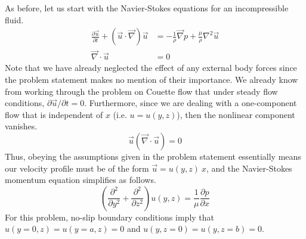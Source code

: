 As before, let us start with the Navier-Stokes equations for an incompressible fluid.
\begin{align}
    \frac{\partial \vec{u}}{\partial t} + (\vec{u}\cdot\vec{\nabla})\vec{u} &= -\frac{1}{\rho}\vec{\nabla}p + \frac{\mu}{\rho}\nabla^2\vec{u}\\
    \vec{\nabla}\cdot\vec{u} &= 0
\end{align}
Note that we have already neglected the effect of any external body forces since the problem statement makes no mention of their importance. We already know from working through the problem on Couette flow that under steady flow conditions, $\partial \vec{u}/\partial t = 0$. Furthermore, since we are dealing with a one-component flow that is independent of $x$ (i.e. $u = u(y,z)$), then the nonlinear component vanishes.
\begin{equation}
    \vec{u}(\vec{\nabla}\cdot\vec{u}) = 0
\end{equation}
Thus, obeying the assumptions given in the problem statement essentially means our velocity profile must be of the form $\vec{u} = u(y,z)\ \hat{x}$, and the Navier-Stokes momentum equation simplifies as follows. 
\begin{equation}
    \boxed{\left(\frac{\partial^2}{\partial y^2} + \frac{\partial^2}{\partial z^2}\right)u(y,z) = \frac{1}{\mu}\frac{\partial p}{\partial x}}
    \label{snsmr}
\end{equation}
For this problem, no-slip boundary conditions imply that $u(y=0,z) = u(y=a,z) = 0$ and $u(y,z=0) = u(y,z=b) = 0$. 